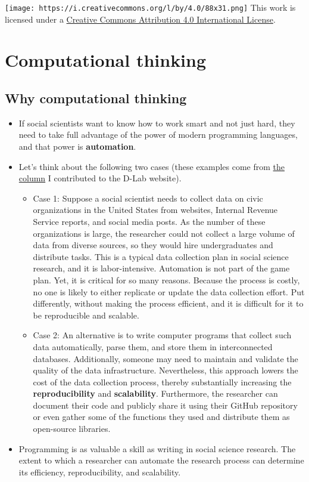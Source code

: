 \documentclass[
]{book}
\begin{document}
\texttt{[image: https://i.creativecommons.org/l/by/4.0/88x31.png]} This work is licensed under a \href{https://creativecommons.org/licenses/by/4.0/}{Creative Commons Attribution 4.0 International License}.

\hypertarget{motivation}{%
\chapter{Computational thinking}\label{motivation}}

\hypertarget{why-computational-thinking}{%
\section{Why computational thinking}\label{why-computational-thinking}}

\begin{itemize}
\item
  If social scientists want to know how to work smart and not just hard, they need to take full advantage of the power of modern programming languages, and that power is \textbf{automation}.
\item
  Let's think about the following two cases (these examples come from \href{https://dlab.berkeley.edu/blog/why-teaching-social-scientists-how-code-professional-important}{the column} I contributed to the D-Lab website).

  \begin{itemize}
  \item
    Case 1: Suppose a social scientist needs to collect data on civic organizations in the United States from websites, Internal Revenue Service reports, and social media posts. As the number of these organizations is large, the researcher could not collect a large volume of data from diverse sources, so they would hire undergraduates and distribute tasks. This is a typical data collection plan in social science research, and it is labor-intensive. Automation is not part of the game plan. Yet, it is critical for so many reasons. Because the process is costly, no one is likely to either replicate or update the data collection effort. Put differently, without making the process efficient, and it is difficult for it to be reproducible and scalable.
  \item
    Case 2: An alternative is to write computer programs that collect such data automatically, parse them, and store them in interconnected databases. Additionally, someone may need to maintain and validate the quality of the data infrastructure. Nevertheless, this approach lowers the cost of the data collection process, thereby substantially increasing the \textbf{reproducibility} and \textbf{scalability}. Furthermore, the researcher can document their code and publicly share it using their GitHub repository or even gather some of the functions they used and distribute them as open-source libraries.
  \end{itemize}
\item
  Programming is as valuable a skill as writing in social science research. The extent to which a researcher can automate the research process can determine its efficiency, reproducibility, and scalability.
\end{itemize}
\end{document}

